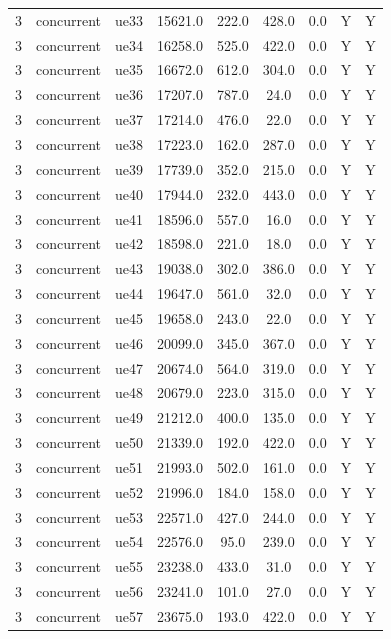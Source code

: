 \begin{table}[ht]
\begin{tabular}{|c|c|c|c|c|c|c|c|c|}
3 & concurrent & ue33 & 15621.0 & 222.0 & 428.0 & 0.0 & Y & Y \\
3 & concurrent & ue34 & 16258.0 & 525.0 & 422.0 & 0.0 & Y & Y \\
3 & concurrent & ue35 & 16672.0 & 612.0 & 304.0 & 0.0 & Y & Y \\
3 & concurrent & ue36 & 17207.0 & 787.0 & 24.0 & 0.0 & Y & Y \\
3 & concurrent & ue37 & 17214.0 & 476.0 & 22.0 & 0.0 & Y & Y \\
3 & concurrent & ue38 & 17223.0 & 162.0 & 287.0 & 0.0 & Y & Y \\
3 & concurrent & ue39 & 17739.0 & 352.0 & 215.0 & 0.0 & Y & Y \\
3 & concurrent & ue40 & 17944.0 & 232.0 & 443.0 & 0.0 & Y & Y \\
3 & concurrent & ue41 & 18596.0 & 557.0 & 16.0 & 0.0 & Y & Y \\
3 & concurrent & ue42 & 18598.0 & 221.0 & 18.0 & 0.0 & Y & Y \\
3 & concurrent & ue43 & 19038.0 & 302.0 & 386.0 & 0.0 & Y & Y \\
3 & concurrent & ue44 & 19647.0 & 561.0 & 32.0 & 0.0 & Y & Y \\
3 & concurrent & ue45 & 19658.0 & 243.0 & 22.0 & 0.0 & Y & Y \\
3 & concurrent & ue46 & 20099.0 & 345.0 & 367.0 & 0.0 & Y & Y \\
3 & concurrent & ue47 & 20674.0 & 564.0 & 319.0 & 0.0 & Y & Y \\
3 & concurrent & ue48 & 20679.0 & 223.0 & 315.0 & 0.0 & Y & Y \\
3 & concurrent & ue49 & 21212.0 & 400.0 & 135.0 & 0.0 & Y & Y \\
3 & concurrent & ue50 & 21339.0 & 192.0 & 422.0 & 0.0 & Y & Y \\
3 & concurrent & ue51 & 21993.0 & 502.0 & 161.0 & 0.0 & Y & Y \\
3 & concurrent & ue52 & 21996.0 & 184.0 & 158.0 & 0.0 & Y & Y \\
3 & concurrent & ue53 & 22571.0 & 427.0 & 244.0 & 0.0 & Y & Y \\
3 & concurrent & ue54 & 22576.0 & 95.0 & 239.0 & 0.0 & Y & Y \\
3 & concurrent & ue55 & 23238.0 & 433.0 & 31.0 & 0.0 & Y & Y \\
3 & concurrent & ue56 & 23241.0 & 101.0 & 27.0 & 0.0 & Y & Y \\
3 & concurrent & ue57 & 23675.0 & 193.0 & 422.0 & 0.0 & Y & Y \\

\end{tabular}
\end{table}
